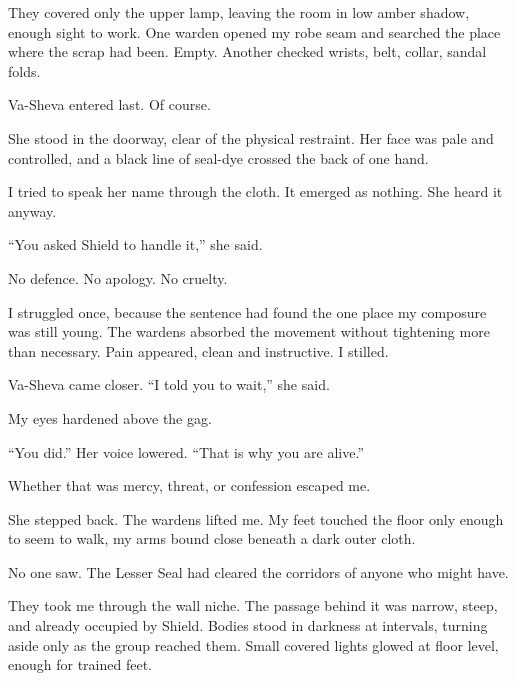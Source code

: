 They covered only the upper lamp, leaving the room in low amber shadow, enough sight to work. One warden opened my robe seam and searched the place where the scrap had been. Empty. Another checked wrists, belt, collar, sandal folds.\par

Va-Sheva entered last. Of course.\par

She stood in the doorway, clear of the physical restraint. Her face was pale and controlled, and a black line of seal-dye crossed the back of one hand.\par

I tried to speak her name through the cloth. It emerged as nothing. She heard it anyway.\par

``You asked Shield to handle it,'' she said.\par

No defence. No apology. No cruelty.\par

I struggled once, because the sentence had found the one place my composure was still young. The wardens absorbed the movement without tightening more than necessary. Pain appeared, clean and instructive. I stilled.\par

Va-Sheva came closer. ``I told you to wait,'' she said.\par

My eyes hardened above the gag.\par

``You did.'' Her voice lowered. ``That is why you are alive.''\par

Whether that was mercy, threat, or confession escaped me.\par

She stepped back. The wardens lifted me. My feet touched the floor only enough to seem to walk, my arms bound close beneath a dark outer cloth.\par

No one saw. The Lesser Seal had cleared the corridors of anyone who might have.\par

They took me through the wall niche. The passage behind it was narrow, steep, and already occupied by Shield. Bodies stood in darkness at intervals, turning aside only as the group reached them. Small covered lights glowed at floor level, enough for trained feet.\par

